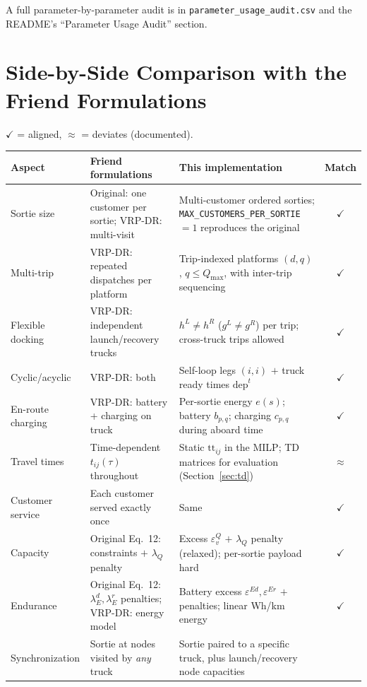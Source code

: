 \documentclass[10pt]{article}
\begin{document}
A full parameter-by-parameter audit is in \texttt{parameter\_usage\_audit.csv} and
the README's ``Parameter Usage Audit'' section.

\appendix
\section{Side-by-Side Comparison with the Friend Formulations}
\label{sec:comparison}

$\checkmark$ = aligned, $\approx$ = deviates (documented).

{\small
\begin{longtable}{@{}p{}p{}p{}c@{}}
\toprule
Aspect & Friend formulations & This implementation & Match \\
\midrule
Sortie size & Original: one customer per sortie; VRP-DR: multi-visit
& Multi-customer ordered sorties; \texttt{MAX\_CUSTOMERS\_PER\_SORTIE}$=1$ reproduces the original
& $\checkmark$ \\
Multi-trip & VRP-DR: repeated dispatches per platform
& Trip-indexed platforms $(d,q)$, $q\le Q_{\max}$, with inter-trip sequencing & $\checkmark$ \\
Flexible docking & VRP-DR: independent launch/recovery trucks
& $h^L\ne h^R$ ($g^L\ne g^R$) per trip; cross-truck trips allowed & $\checkmark$ \\
Cyclic/acyclic & VRP-DR: both & Self-loop legs $(i,i)$ $+$ truck ready times $\mathrm{dep}^t$ & $\checkmark$ \\
En-route charging & VRP-DR: battery + charging on truck
& Per-sortie energy $e(s)$; battery $b_{p,q}$; charging $c_{p,q}$ during aboard time & $\checkmark$ \\
Travel times & Time-dependent $t_{ij}(\tau)$ throughout
& Static $\mathrm{tt}_{ij}$ in the MILP; TD matrices for evaluation (Section~\ref{sec:td})
& $\approx$ \\
Customer service & Each customer served exactly once & Same & $\checkmark$ \\
Capacity & Original Eq.~12: constraints $+$ $\lambda_Q$ penalty
& Excess $\varepsilon^Q_v$ $+$ $\lambda_Q$ penalty (relaxed); per-sortie payload hard & $\checkmark$ \\
Endurance & Original Eq.~12: $\lambda^d_E,\lambda^r_E$ penalties; VRP-DR: energy model
& Battery excess $\varepsilon^{Ed},\varepsilon^{Er}$ $+$ penalties; linear Wh/km energy & $\checkmark$ \\
Synchronization & Sortie at nodes visited by \emph{any} truck
& Sortie paired to a specific truck, plus launch/recovery node capacities

\end{longtable}}
\end{document}
